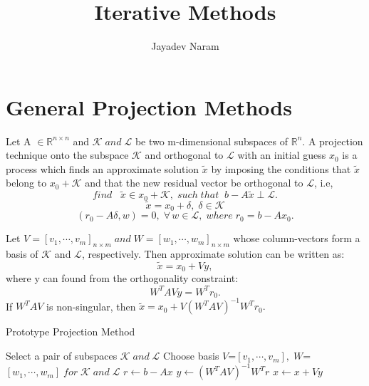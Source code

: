 \documentclass[10pt,a4paper]{article}
\author{Jayadev Naram}
\title{Iterative Methods}
\begin{document}
\maketitle 

\maketitle
 
\tableofcontents

\newpage

  
\newtheorem{theorem}{Theorem}
\newtheorem{corollary}{Corollary}[theorem]
\newtheorem{lemma}[theorem]{Lemma}
\newtheorem{mydef}{Definition}
\newtheorem*{remark}{Remark}
\newtheorem{prop}{Proposition}

\section{General Projection Methods}

Let A $\in\mathbb{R}^{n\times n}$ and $\mathcal{K}\;and\;\mathcal{L}$ be two m-dimensional subspaces of $\mathbb{R}^n$. A projection technique onto the subspace $\mathcal{K}$ and orthogonal to $\mathcal{L}$ with an initial guess $x_0$ is a process which finds an approximate solution $\tilde{x}$ by imposing the conditions that $\tilde{x}$ belong to $x_0+\mathcal{K}$ and that the new residual vector be orthogonal to $\mathcal{L}$, i.e, $$find\;\;\;\tilde{x}\in x_0+\mathcal{K},\;such\;that\;\;b-A\tilde{x}\perp \mathcal{L}.$$
$$\tilde{x}=x_0+\delta,\;\delta\in\mathcal{K}$$
$$(r_0-A\delta,w)=0,\;\forall\,w\in\mathcal{L},\;where\;r_0=b-Ax_0.$$

Let $V=[v_1,\cdots,v_m]_{n\times m}\;and\;W=[w_1,\cdots,w_m]_{n\times m}$ whose column-vectors form a basis of $\mathcal{K}$ and $\mathcal{L}$, respectively.
Then approximate solution can be written as:
$$\tilde{x}=x_0+Vy,$$
where y can found from the orthogonality constraint:
$$W^TAVy=W^Tr_0.$$
If $W^TAV$ is non-singular, then $\tilde{x}=x_0+V(W^TAV)^{-1}W^Tr_0.$

\begin{algorithm}
\caption{Prototype Projection Method}
\begin{algorithmic}[1]
\Repeat
	\State Select a pair of subspaces $\mathcal{K}\;and\;\mathcal{L}$
	\State Choose basis $V$=$[v_1,\cdots,v_m],\;W$=$[w_1,\cdots,w_m]\;for\;\mathcal{K}\;and\;\mathcal{L}$
	\State $r\gets b-Ax$
	\State $y\gets (W^TAV)^{-1}W^Tr$
	\State $x\gets x+Vy$
\end{algorithmic}
\end{algorithm}
\end{document}
